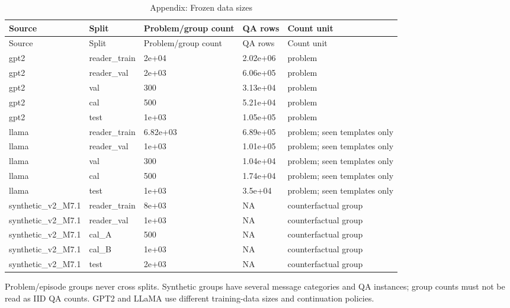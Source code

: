 \begingroup\scriptsize\setlength{\tabcolsep}{3pt}
\begin{longtable}{@{}p{}p{}p{}p{}p{}@{}}
\caption{Appendix: Frozen data sizes}\label{tab:appendix-data-scales}\\
\toprule
Source & Split & Problem/group count & QA rows & Count unit \\
\midrule\endfirsthead
\toprule
Source & Split & Problem/group count & QA rows & Count unit \\
\midrule\endhead
gpt2 & reader\_train & 2e+04 & 2.02e+06 & problem \\
gpt2 & reader\_val & 2e+03 & 6.06e+05 & problem \\
gpt2 & val & 300 & 3.13e+04 & problem \\
gpt2 & cal & 500 & 5.21e+04 & problem \\
gpt2 & test & 1e+03 & 1.05e+05 & problem \\
llama & reader\_train & 6.82e+03 & 6.89e+05 & problem; seen templates only \\
llama & reader\_val & 1e+03 & 1.01e+05 & problem; seen templates only \\
llama & val & 300 & 1.04e+04 & problem; seen templates only \\
llama & cal & 500 & 1.74e+04 & problem; seen templates only \\
llama & test & 1e+03 & 3.5e+04 & problem; seen templates only \\
synthetic\_v2\_M7.1 & reader\_train & 8e+03 & NA & counterfactual group \\
synthetic\_v2\_M7.1 & reader\_val & 1e+03 & NA & counterfactual group \\
synthetic\_v2\_M7.1 & cal\_A & 500 & NA & counterfactual group \\
synthetic\_v2\_M7.1 & cal\_B & 1e+03 & NA & counterfactual group \\
synthetic\_v2\_M7.1 & test & 2e+03 & NA & counterfactual group \\
\bottomrule
\end{longtable}
\noindent Problem/episode groups never cross splits. Synthetic groups have several message categories and QA instances; group counts must not be read as IID QA counts. GPT2 and LLaMA use different training-data sizes and continuation policies.
\endgroup

